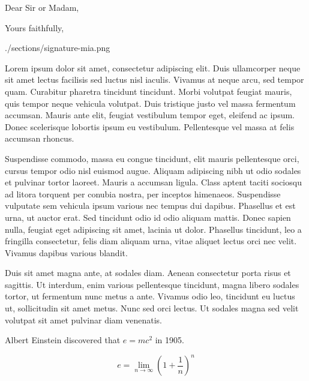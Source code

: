 \date{January 01, 1984}
\subject{Job application}
\opening{Dear Sir or Madam,}
\closing{Yours faithfully,}

\signature{0.4}{./sections/signature-mia.png} %
\makelettertitle

Lorem ipsum dolor sit amet, consectetur adipiscing elit. Duis ullamcorper neque sit amet lectus facilisis sed luctus nisl iaculis. Vivamus at neque arcu, sed tempor quam. Curabitur pharetra tincidunt tincidunt. Morbi volutpat feugiat mauris, quis tempor neque vehicula volutpat. Duis tristique justo vel massa fermentum accumsan. Mauris ante elit, feugiat vestibulum tempor eget, eleifend ac ipsum. Donec scelerisque lobortis ipsum eu vestibulum. Pellentesque vel massa at felis accumsan rhoncus.

Suspendisse commodo, massa eu congue tincidunt, elit mauris pellentesque orci, cursus tempor odio nisl euismod augue. Aliquam adipiscing nibh ut odio sodales et pulvinar tortor laoreet. Mauris a accumsan ligula. Class aptent taciti sociosqu ad litora torquent per conubia nostra, per inceptos himenaeos. Suspendisse vulputate sem vehicula ipsum various nec tempus dui dapibus. Phasellus et est urna, ut auctor erat. Sed tincidunt odio id odio aliquam mattis. Donec sapien nulla, feugiat eget adipiscing sit amet, lacinia ut dolor. Phasellus tincidunt, leo a fringilla consectetur, felis diam aliquam urna, vitae aliquet lectus orci nec velit. Vivamus dapibus various blandit.

Duis sit amet magna ante, at sodales diam. Aenean consectetur porta risus et sagittis. Ut interdum, enim various pellentesque tincidunt, magna libero sodales tortor, ut fermentum nunc metus a ante. Vivamus odio leo, tincidunt eu luctus ut, sollicitudin sit amet metus. Nunc sed orci lectus. Ut sodales magna sed velit volutpat sit amet pulvinar diam venenatis.

Albert Einstein discovered that $e=mc^2$ in 1905.

\[ e=\lim_{n \to \infty} \left(1+\frac{1}{n}\right)^n \]

\makeletterclosing